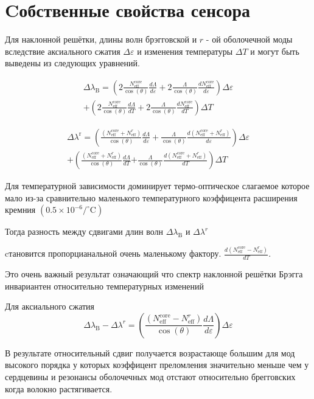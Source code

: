 
\section{Cобственные свойства сенсора}

Для наклонной решётки, длины волн брэгговской и $ r $ - ой оболочечной моды
вследствие аксиального сжатия $ \Delta \varepsilon $ и изменения температуры $ \Delta T $ и могут быть выведены из следующих уравнений.



$$
\begin{aligned}
\Delta \lambda_{\mathrm{B}}=\left(2 \frac{N_{\mathrm{eff}}^{\mathrm{core}}}{\cos (\theta)} \frac{d \Lambda}{d \varepsilon}+2 \frac{\Lambda}{\cos (\theta)} \frac{d N_{\mathrm{eff}}^{\mathrm{core}}}{d \varepsilon}\right) \Delta \varepsilon \\
+\left(2 \frac{N_{\mathrm{eff}}^{\mathrm{core}}}{\cos (\theta)} \frac{d \Lambda}{d T}+2 \frac{\Lambda}{\cos (\theta)} \frac{d N_{\mathrm{eff}}^{\mathrm{core}}}{d T}\right) \Delta T 
\end{aligned}
$$



$$
\begin{aligned}
\Delta
 \lambda^{\mathrm{r}}=\left(\frac{\left(N_{\mathrm{eff}}^{\mathrm{core}}+N_{\mathrm{eff}}^{r}\right)}{\cos (\theta)} \frac{d \Lambda}{d \varepsilon}+\frac{\Lambda}{\cos (\theta)} \frac{d\left(N_{\mathrm{eff}}^{\mathrm{core}}+N_{\mathrm{eff}}^{r}\right)}{d \varepsilon}\right) \Delta \varepsilon  \\
+\left(\frac{\left(N_{\mathrm{eff}}^{\mathrm{core}}+N_{\mathrm{eff}}^{r}\right)}{\cos (\theta)} \frac{d \Lambda}{d T}\right.
\left.+\frac{\Lambda}{\cos (\theta)} \frac{d\left(N_{\mathrm{eff}}^{\mathrm{core}}+N_{\mathrm{eff}}^{r}\right)}{d T}\right) \Delta T
\end{aligned}
$$

Для температурной зависимости доминирует термо-оптическое слагаемое которое мало из-за сравнительно маленького температурного коэффицента расширения кремния $\left(0.5 \times 10^{-6} /^{\circ} \mathrm{C}\right)$


Тогда разность между сдвигами длин волн $\Delta \lambda_{\mathrm{B}}$  и $\Delta \lambda^{r}$

cтановится пропорцианальной очень маленькому фактору. $\frac{d\left(N_{\mathrm{eff}}^{\mathrm{core}}-N_{\mathrm{eff}}^{r}\right)}{ d T}$.

Это очень важный результат означающий что спектр наклонной решётки Брэгга инвариантен относительно температурных изменений


Для аксиального сжатия
\begin{equation}\Delta \lambda_{\mathrm{B}}-\Delta \lambda^{r}=\left(\frac{\left(N_{\mathrm{eff}}^{\mathrm{core}}-N_{\mathrm{eff}}^{r}\right)}{\cos (\theta)} \frac{d \Lambda}{d \varepsilon}\right) \Delta \varepsilon\end{equation}


В результате относительный сдвиг получается возрастающе большим для мод высокого порядка у которых коэффицент преломления значительно меньше чем у сердцевины и резонансы оболочечных мод отстают относительно брегговских когда волокно растягивается.
